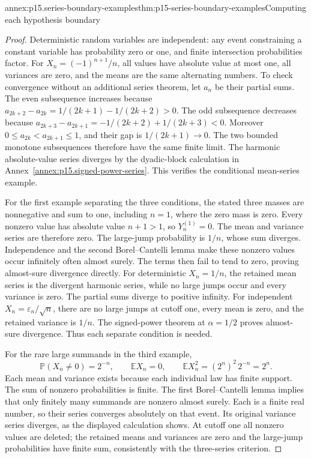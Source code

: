 \begin{annexitem}{annex:p15.series-boundary-examples}{thm:p15-series-boundary-examples}{Computing each hypothesis boundary}
\begin{proof}
Deterministic random variables are independent: any event constraining
a constant variable has probability zero or one, and finite
intersection probabilities factor. For \(X_n=(-1)^{n+1}/n\),
all values have absolute value at most one, all variances are zero,
and the means are the same alternating numbers. To check convergence
without an additional series theorem, let \(a_n\) be their partial
sums. The even subsequence increases because
\(a_{2k+2}-a_{2k}=1/(2k+1)-1/(2k+2)>0\).
The odd subsequence decreases because
\(a_{2k+3}-a_{2k+1}=-1/(2k+2)+1/(2k+3)<0\).
Moreover \(0\leq a_{2k}<a_{2k+1}\leq1\), and their gap is
\(1/(2k+1)\to0\). The two bounded monotone subsequences
therefore have the same finite limit. The harmonic absolute-value
series diverges by the dyadic-block calculation in
Annex~\ref{annex:p15.signed-power-series}. This verifies the
conditional mean-series example.

For the first example separating the three conditions, the stated
three masses are nonnegative and sum to one, including \(n=1\),
where the zero mass is zero. Every nonzero value has absolute value
\(n+1>1\), so \(Y_n^{(1)}=0\). The mean and variance series
are therefore zero. The large-jump probability is \(1/n\), whose
sum diverges. Independence and the second Borel--Cantelli lemma make
these nonzero values occur infinitely often almost surely. The terms
then fail to tend to zero, proving almost-sure divergence directly.
For deterministic \(X_n=1/n\), the retained mean series is the
divergent harmonic series, while no large jumps occur and every
variance is zero. The partial sums diverge to positive infinity.
For independent \(X_n=\varepsilon_n/\sqrt n\), there are no
large jumps at cutoff one, every mean is zero, and the retained
variance is \(1/n\). The signed-power theorem at \(\alpha=1/2\)
proves almost-sure divergence. Thus each separate condition is needed.

For the rare large summands in the third example,
\[
 \mathbb P(X_n\ne0)=2^{-n},\qquad
 \mathbb EX_n=0,\qquad
 \mathbb EX_n^2=(2^n)^2\,2^{-n}=2^n.
\]
Each mean and variance exists because each individual law has finite
support. The sum of nonzero probabilities is finite. The first
Borel--Cantelli lemma implies that only finitely many summands are
nonzero almost surely. Each is a finite real number, so their series
converges absolutely on that event. Its original variance series
diverges, as the displayed calculation shows. At cutoff one all
nonzero values are deleted; the retained means and variances are
zero and the large-jump probabilities have finite sum, consistently
with the three-series criterion.


\end{proof}
\end{annexitem}
